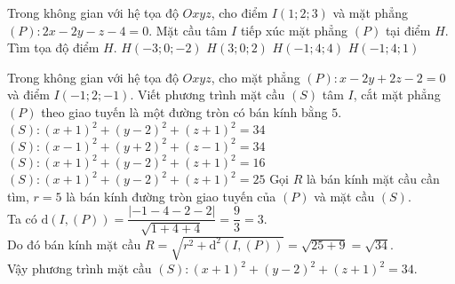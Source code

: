 \begin{ex}%
	Trong không gian với hệ tọa độ $Oxyz$, cho điểm $I(1;2;3)$ và mặt phẳng $(P):2x-2y-z-4=0.$ Mặt cầu tâm $I$ tiếp xúc mặt phẳng $(P)$  tại điểm $H$.
	Tìm tọa độ điểm $H$.
	\choice
	{$H(-3;0;-2)$}
	{\True $H(3;0;2)$}
	{$H(-1;4;4)$}
	{$H(-1;4;1)$}
\end{ex}
\begin{ex}%
	Trong không gian với hệ tọa độ $Oxyz$, cho mặt phẳng $(P)\colon x-2y+2z-2=0$ và điểm $I(-1;2;-1)$. Viết phương trình mặt cầu $(S)$ tâm $I$, cắt mặt phẳng $(P)$ theo giao tuyến là một đường tròn có bán kính bằng $5$.
	\choice
	{\True $(S)\colon (x+1)^2+(y-2)^2+(z+1)^2=34$}
	{$(S)\colon (x-1)^2+(y+2)^2+(z-1)^2=34$}
	{$(S)\colon (x+1)^2+(y-2)^2+(z+1)^2=16$}
	{$(S)\colon (x+1)^2+(y-2)^2+(z+1)^2=25$}
	\loigiai
	{Gọi $R$ là bán kính mặt cầu cần tìm, $r=5$ là bán kính đường tròn giao tuyến của $(P)$ và mặt cầu $(S)$.\\
		Ta có $\mathrm{d}(I,(P))=\dfrac{|-1-4-2-2|}{\sqrt{1+4+4}}=\dfrac{9}{3}=3$.\\
		Do đó bán kính mặt cầu $R=\sqrt{r^2+\mathrm{d}^2(I,(P))}=\sqrt{25+9}=\sqrt{34}$.\\
		Vậy phương trình mặt cầu $(S)\colon (x+1)^2+(y-2)^2+(z+1)^2=34$.}
\end{ex}
